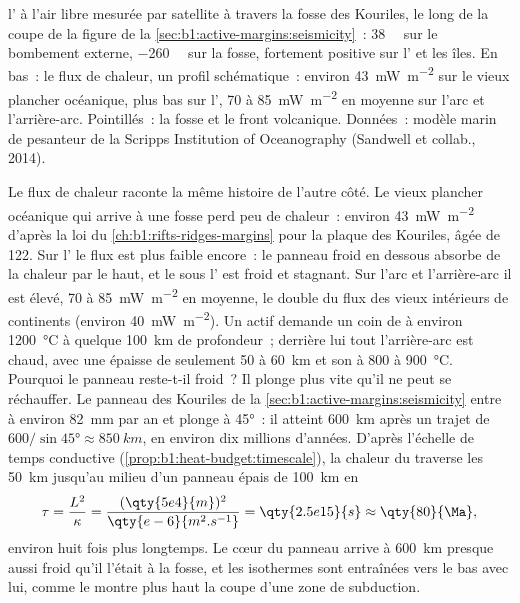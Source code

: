 \begin{omfigure}
{l' à l'air libre mesurée par satellite à travers la fosse des Kouriles, le long
de la coupe de la figure de la \cref{sec:b1:active-margins:seismicity}~:
\qty{38}{\milli\gal} sur le bombement externe, \qty{-260}{\milli\gal} sur la
fosse, fortement positive sur l' et les îles. En bas~: le flux de chaleur,
un profil schématique~: environ \qty{43}{mW.m^{-2}} sur le vieux plancher océanique, plus bas
sur l', 70 à \qty{85}{mW.m^{-2}} en moyenne sur l'arc et
l'arrière-arc. Pointillés~: la fosse et le front volcanique. Données~: modèle marin de
pesanteur de la Scripps Institution of Oceanography (Sandwell et collab., 2014).}
\label{fig:b1:active-margins:profiles}
\end{omfigure}

Le flux de chaleur raconte la même histoire de l'autre côté. Le vieux plancher océanique
qui arrive à une fosse perd peu de chaleur~: environ \qty{43}{mW.m^{-2}} d'après la loi
du \cref{ch:b1:rifts-ridges-margins} pour la plaque des Kouriles, âgée de \qty{122}{\Ma}.
Sur l' le flux est plus faible encore~: le panneau froid en dessous absorbe de la
chaleur par le haut, et le  sous l' est froid et stagnant. Sur l'arc
et l'arrière-arc il est élevé, 70 à \qty{85}{mW.m^{-2}} en moyenne, le double du
flux des vieux intérieurs de continents (environ \qty{40}{mW.m^{-2}}). Un  actif demande un coin de  à environ \qty{1200}{\celsius} à quelque
\qty{100}{km} de profondeur~; derrière lui tout l'arrière-arc est chaud, avec une 
épaisse de seulement 50 à \qty{60}{km} et son  à 800 à \qty{900}{\celsius}.
Pourquoi le panneau reste-t-il froid~? Il plonge plus vite qu'il ne peut se réchauffer. Le panneau
des Kouriles de la \cref{sec:b1:active-margins:seismicity} entre à environ
\qty{82}{mm} par an et plonge à \ang{45}~: il atteint \qty{600}{km} après un trajet
de $600/\sin\ang{45} \approx \qty{850}{km}$, en environ dix millions d'années. D'après
l'échelle de temps conductive (\cref{prop:b1:heat-budget:timescale}), la chaleur du
 traverse les \qty{50}{km} jusqu'au milieu d'un panneau épais de \qty{100}{km} en
\[
  \tau = \frac{L^2}{\kappa} = \frac{(\qty{5e4}{m})^2}{\qty{e-6}{m^2.s^{-1}}}
  = \qty{2.5e15}{s} \approx \qty{80}{\Ma},
\]
environ huit fois plus longtemps. Le cœur du panneau arrive à \qty{600}{km} presque aussi
froid qu'il l'était à la fosse, et les isothermes sont entraînées vers le bas avec lui, comme le
montre plus haut la coupe d'une zone de subduction.

